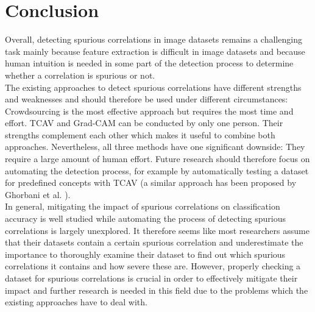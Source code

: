 \documentclass{article}
\begin{document}
\section{Conclusion}
Overall, detecting spurious correlations in image datasets remains a challenging task mainly because feature extraction is difficult in image datasets and
because human intuition is needed in some part of the detection process to determine whether a correlation is spurious or not. \\
The existing approaches to detect spurious correlations have different strengths and weaknesses and should therefore be used under different circumstances: 
Crowdsourcing is the most effective approach but requires the most time and effort. TCAV and Grad-CAM can be conducted by only one person. 
Their strengths complement each other which makes it useful to combine both approaches. Nevertheless, all three methods have one significant downside: 
They require a large amount of human effort. Future research should therefore focus on automating the detection process, for example by automatically testing
a dataset for predefined concepts with TCAV (a similar approach has been proposed by Ghorbani et al. \cite{ghorbani2019automating}). \\
In general, mitigating the impact of spurious correlations on classification accuracy is well studied while automating the process of detecting spurious
correlations is largely unexplored. It therefore seems like most researchers assume that their datasets contain a certain spurious correlation and 
underestimate the importance to thoroughly examine their dataset to find out which spurious correlations it contains and how severe these are. 
However, properly checking a dataset for spurious correlations is crucial in order to effectively mitigate their impact and further research
is needed in this field due to the problems which the existing approaches have to deal with.


\printbibliography
\end{document}

